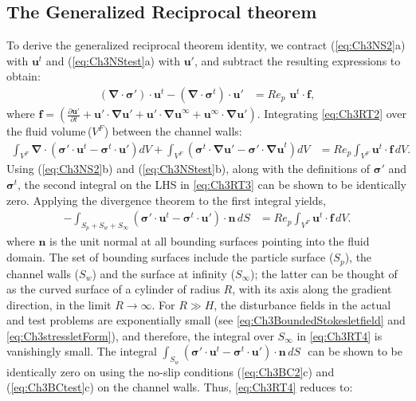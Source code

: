 \documentclass{jfm}
\begin{document}
\subsection{The Generalized Reciprocal theorem} \label{sec:Ch3GRT}
To derive the generalized reciprocal theorem identity, we contract  (\ref{eq:Ch3NS2}a) with $\bm{u}^t$ and (\ref{eq:Ch3NStest}a) with $\bm{u}'$, and subtract the resulting expressions\citep{holeal1974} to obtain:
\begin{align}
(\bm{\nabla}\cdot\bm{\sigma}')\cdot \bm{u}^t-(\bm{\nabla}\cdot\bm{\sigma}^t) \cdot \bm{u}'&=Re_p\,\,\bm{u}^t\cdot\bm{f}, \label{eq:Ch3RT2}
\end{align}
where $\bm{f}=\left(\frac{\partial\bm{u}'}{\partial t}+\bm{u}'\cdot\bm{\nabla u}'+\bm{u}'\cdot\bm{\nabla u}^\infty+\bm{u}^\infty\cdot\bm{\nabla u}'\right)$. Integrating \eqref{eq:Ch3RT2} over the fluid volume\,($V^F$) between the channel walls:
\begin{align}
\int_{V^F} \bm{\nabla}\cdot(\bm{\sigma}'\cdot \bm{u}^t-\bm{\sigma}^t\cdot \bm{u}')dV + \int_{V^F} (\bm{\sigma}^t\cdot\bm{\nabla u}'-\bm{\sigma}'\cdot \bm{\nabla u}^t)dV &=Re_p\int_{V^F}\bm{u}^t\cdot\bm{f}\,dV. \label{eq:Ch3RT3}
\end{align}
Using (\ref{eq:Ch3NS2}b) and (\ref{eq:Ch3NStest}b), along with the definitions of $\bm{\sigma}'$ and $\bm{\sigma}^t$, the second integral on the LHS in \eqref{eq:Ch3RT3} can be shown to be identically zero. Applying the divergence theorem to the first integral yields,
\begin{align}
-\int_{S_p+S_w+S_\infty} (\bm{\sigma}'\cdot\bm{u}^t-\bm{\sigma}^t\cdot \bm{u}')\cdot \bm{n}\,dS &=Re_p\int_{V^F}\bm{u}^t\cdot\bm{f}\,dV. \label{eq:Ch3RT4}
\end{align}
where $\bm{n}$ is the unit normal at all bounding surfaces pointing into the fluid domain. The set of bounding surfaces include the particle surface ($S_p$), the channel walls ($S_w$) and the surface at infinity ($S_\infty$); the latter can be thought of as the curved surface of a cylinder of radius $R$, with its axis along the gradient direction, in the limit $R\to\infty$. For $R\gg H$, the disturbance fields in the actual and test problems are exponentially small (see \eqref{eq:Ch3BoundedStokesletfield} and \eqref{eq:Ch3stressletForm}), and therefore, the integral over $S_\infty$ in \eqref{eq:Ch3RT4} is vanishingly small. The integral $\int_{S_w} (\bm{\sigma}'\cdot \bm{u}^t-\bm{\sigma}^t\cdot \bm{u}')\cdot \bm{n}\,dS\,\,$ can be shown to be identically zero on using the no-slip conditions (\ref{eq:Ch3BC2}c) and (\ref{eq:Ch3BCtest}c) on the channel walls. Thus, \eqref{eq:Ch3RT4} reduces to:
\end{document}

